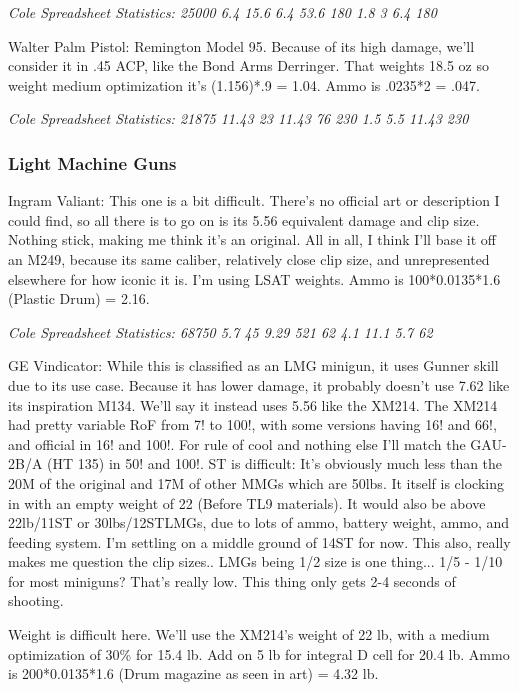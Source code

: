 \begin{multicols*}{2}
	\textit{\textcolor{OliveGreen}{Cole Spreadsheet Statistics: 25000 6.4 15.6 6.4 53.6 180 1.8 3 6.4 180}}
	
	Walter Palm Pistol: Remington Model 95. Because of its high damage, we'll consider it in .45 ACP, like the Bond Arms Derringer. That weights 18.5 oz so weight medium optimization it's (1.156)*.9 = 1.04. Ammo is .0235*2 = .047.
	
	\textit{\textcolor{OliveGreen}{Cole Spreadsheet Statistics: 21875 11.43 23 11.43 76 230 1.5 5.5 11.43 230}}
	
	\subsubsection{Light Machine Guns}
	
	Ingram Valiant: This one is a bit difficult. There's no official art or description I could find, so all there is to go on is its 5.56 equivalent damage and clip size. Nothing stick, making me think it's an original. All in all, I think I'll base it off an M249, because its same caliber, relatively close clip size, and unrepresented elsewhere for how iconic it is. I'm using LSAT weights. Ammo is 100*0.0135*1.6 (Plastic Drum) = 2.16.
	
	\textit{\textcolor{OliveGreen}{Cole Spreadsheet Statistics: 68750 5.7 45 9.29 521 62 4.1 11.1 5.7 62}}
	
	GE Vindicator: While this is classified as an LMG minigun, it uses Gunner skill due to its use case. Because it has lower damage, it probably doesn't use 7.62 like its inspiration M134. We'll say it instead uses 5.56 like the XM214. The XM214 had pretty variable RoF from 7! to 100!, with some versions having 16! and 66!, and official in 16! and 100!. For rule of cool and nothing else I'll match the GAU-2B/A (HT 135) in 50! and 100!. ST is difficult: It's obviously much less than the 20M of the original and 17M of other MMGs which are 50lbs. It itself is clocking in with an empty weight of 22 (Before TL9 materials). It would also be above 22lb/11ST  or 30lbs/12STLMGs, due to lots of ammo, battery weight, ammo, and feeding system. I'm settling on a middle ground of 14ST for now. This also, really makes me question the clip sizes.. LMGs being 1/2 size is one thing... 1/5 - 1/10 for most miniguns? That's really low. This thing only gets 2-4 seconds of shooting.
	
	Weight is difficult here. We'll use the XM214's weight of 22 lb, with a medium optimization of 30\% for 15.4 lb. Add on 5 lb for integral D cell for 20.4 lb. Ammo is 200*0.0135*1.6 (Drum magazine as seen in art) = 4.32 lb.
	

\end{multicols*}
